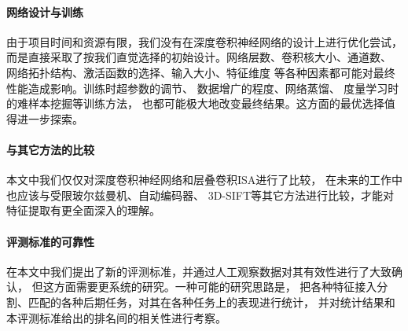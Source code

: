 \paragraph{网络设计与训练}
由于项目时间和资源有限，我们没有在深度卷积神经网络的设计上进行优化尝试，
而是直接采取了按我们直觉选择的初始设计。网络层数、卷积核大小、通道数、
网络拓扑结构、激活函数的选择、输入大小、特征维度
等各种因素都可能对最终性能造成影响。训练时超参数的调节、
数据增广的程度、网络蒸馏\cite{hinton2015distilling}、
度量学习时的难样本挖掘等训练方法，
也都可能极大地改变最终结果。这方面的最优选择值得进一步探索。

\paragraph{与其它方法的比较}
本文中我们仅仅对深度卷积神经网络和层叠卷积ISA进行了比较，
在未来的工作中也应该与受限玻尔兹曼机、自动编码器、
3D-SIFT等其它方法进行比较，才能对特征提取有更全面深入的理解。

\paragraph{评测标准的可靠性}
在本文中我们提出了新的评测标准，并通过人工观察数据对其有效性进行了大致确认，
但这方面需要更系统的研究。一种可能的研究思路是，
把各种特征接入分割、匹配的各种后期任务，对其在各种任务上的表现进行统计，
并对统计结果和本评测标准给出的排名间的相关性进行考察。


